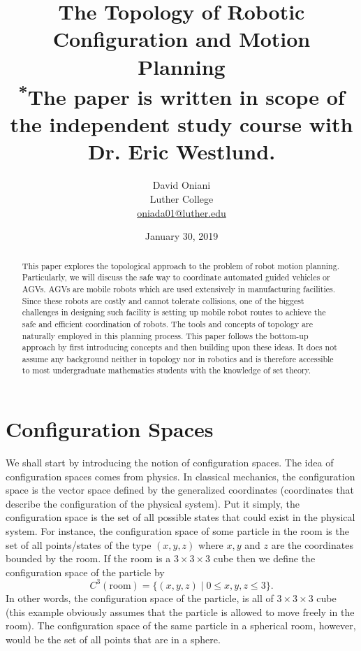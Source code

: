 \documentclass[12pt]{article}
\title{\textbf{The Topology of Robotic Configuration and Motion Planning}\\
{\small \textsuperscript{*}The paper is written in scope of the independent study course with Dr. Eric Westlund.}}
\author{David Oniani\\Luther College\\\href{mailto:oniada01@luther.edu}{oniada01@luther.edu}}
\date{January 30, 2019}
\theoremstyle{definition}
\begin{document}
\maketitle


\begin{abstract}

\noindent This paper explores the topological approach to the problem
of robot motion planning. Particularly, we will discuss the safe way
to coordinate automated guided vehicles or AGVs. AGVs are mobile robots
which are used extensively in manufacturing facilities. Since these robots
are costly and cannot tolerate collisions, one of the biggest challenges
in designing such facility is setting up mobile robot routes to achieve
the safe and efficient coordination of robots. The tools and concepts of
topology are naturally employed in this planning process. This paper
follows the bottom-up approach by first introducing concepts and then
building upon these ideas. It does not assume any background neither in
topology nor in robotics and is therefore accessible to most undergraduate
mathematics students with the knowledge of set theory.
\end{abstract}


\newpage
\tableofcontents
\newpage


\section*{\centering Configuration Spaces}

We shall start by introducing the notion of configuration spaces.
The idea of configuration spaces comes from physics. In classical
mechanics, the configuration space is the vector space defined by
the generalized coordinates (coordinates that describe the configuration
of the physical system). Put it simply, the configuration space is
the set of all possible states that could exist in the physical system.
For instance, the configuration space of some particle in the room is
the set of all points/states of the type $(x, y, z)$ where $x, y$ and $z$
are the coordinates bounded by the room. If the room is a $3 \times 3 \times 3$
cube then we define the configuration space of the particle by
$$C^3(\text{room}) = \{(x, y, z) \mid 0 \leq x, y, z \leq 3\}.$$
In other words, the configuration space of the particle, is all of
$3 \times 3 \times 3$ cube (this example obviously assumes that the
particle is allowed to move freely in the room). The configuration space
of the same particle in a spherical room, however, would be the set of all
points that are in a sphere.
\end{document}
